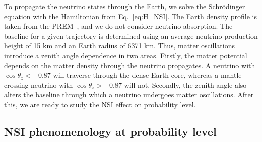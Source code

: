 \documentclass[draft=True]{revtex4-2}
\newcommand{\emt}{\ensuremath{\epsilon_{\mu\tau}}}
\newcommand{\eem}{\epsilon_{e\mu}}
\newcommand{\nm}{\nu_\mu}
\newcommand{\anm}{\bar\nu_\mu}
\begin{document}
To propagate the neutrino states through the Earth, we solve the Schrödinger equation with the Hamiltonian from Eq.~\ref{eq:H_NSI}. 
The Earth density profile is taken from the PREM~\cite{PREM}, and we do not consider neutrino absorption.
The baseline for a given trajectory is determined using an average neutrino production height of 15 km and an Earth radius of 6371 km.
Thus, matter oscillations introduce a zenith angle dependence in two areas. Firstly, the matter potential depends on the matter density through the
neutrino propagates. A neutrino with $\cos{\theta_z} < -0.87$ will traverse through the dense Earth core, whereas a mantle-crossing neutrino 
with $\cos{\theta_z} > -0.87$ will not. Secondly, the zenith angle also alters the baseline through which a neutrino undergoes matter oscillations.
After this, we are ready to study the NSI effect on probability level.

\subsection{NSI phenomenology at probability level}\label{sec:nsiProbEffects}

\end{document}
